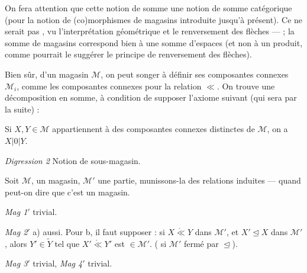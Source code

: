 \documentclass[11pt,a4paper]{article}
\begin{document}
On fera attention que cette notion de somme \ill{}  une notion de somme  catégorique (pour la notion de (co)morphismes de magasins introduite jusqu'à présent). Ce ne serait pas , vu l'interprétation géométrique et le renversement des flèches —  ; la somme de magasins correspond bien à une somme d'espaces (et non à un produit, comme pourrait le suggérer le principe de renversement des flèches).

Bien sûr,  d'un magasin $\mathcal{M}$, on peut songer à définir ses composantes connexes $\mathcal{M}_i$, comme les composantes connexes pour la relation $\ll$. On trouve une décomposition en somme, à condition de supposer l'axiome suivant (qui sera  par la suite) :

\textit{} \quad Si $X,Y\in\mathcal{M}$ appartiennent à des composantes connexes distinctes de $\mathcal{M}$, on a $X\mathbin{|0|}Y$.

\textit{Digression 2} \quad Notion de sous-magasin.

Soit $\mathcal{M}$,  un magasin, $\mathcal{M}'$ une partie, munissons-la des relations induites — quand peut-on dire que c'est un magasin.

\textit{Mag 1$'$} trivial.

\textit{Mag 2$'$} a) aussi. Pour b, il faut supposer :  si $X\mathbin{\mathring{\ll}}Y$ dans $\mathcal{M}'$, et $X'\trianglelefteq X$ dans $\mathcal{M}'$, alors \add{\ill{}}  $Y'\in\widetilde{Y}$ tel que $X'\mathbin{\mathring{\ll}}Y'$ est $\in\mathcal{M}'$. ( si $\mathcal{M}'$ fermé par $\trianglelefteq$).

\textit{Mag 3$'$} trivial, \textit{Mag 4$'$} trivial.

\end{document}
